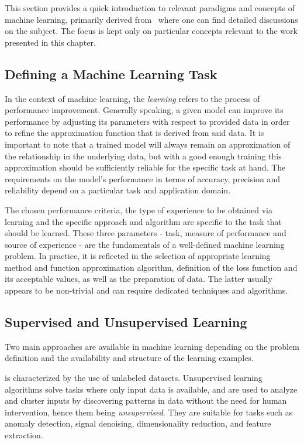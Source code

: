 This section provides a quick introduction to relevant paradigms and concepts of machine learning, primarily derived from~\cite{BOOK:Mitchell:Machine_Learning,BOOK:Hastie:Elements_Statistical_Learning} where one can find detailed discussions on the subject.
The focus is kept only on particular concepts relevant to the work presented in this chapter.

\subsection{Defining a Machine Learning Task}

In the context of machine learning, the \textit{learning} refers to the process of performance improvement.
Generally speaking, a given model can improve its performance by adjusting its parameters with respect to provided data in order to refine the approximation function that is derived from said data. 
It is important to note that a trained model will always remain an approximation of the relationship in the underlying data, but with a good enough training this approximation should be sufficiently reliable for the specific task at hand.
The requirements on the model's performance in terms of accuracy, precision and reliability depend on a particular task and application domain.

The chosen performance criteria, the type of experience to be obtained via learning and the specific approach and algorithm are specific to the task that should be learned.
These three parameters - task, measure of performance and source of experience - are the fundamentals of a well-defined machine learning problem.
In practice, it is reflected in the selection of appropriate learning method and function approximation algorithm, definition of the loss function and its acceptable values, as well as the preparation of data.
The latter usually appears to be non-trivial and can require dedicated techniques and algorithms. %

\subsection{Supervised and Unsupervised Learning}

Two main approaches are available in machine learning depending on the problem definition and the availability and structure of the learning examples.

 is characterized by the use of unlabeled datasets.
Unsupervised learning algorithms solve tasks where only input data is available, and are used to analyze and cluster inputs by discovering patterns in data without the need for human intervention, hence them being \textit{unsupervised}.
They are suitable for tasks such as anomaly detection, signal denoising, dimensionality reduction, and feature extraction.

